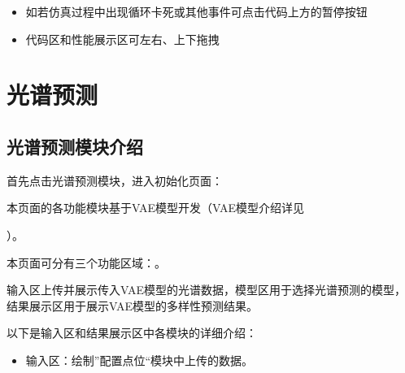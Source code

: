 \documentclass[letterpaper,10pt,english]{sphinxmanual}
\begin{document}
{{{{\begin{itemize}
\item {} 
\sphinxAtStartPar
如若仿真过程中出现循环卡死或其他事件可点击代码上方的暂停按钮

\item {} 
\sphinxAtStartPar
代码区和性能展示区可左右、上下拖拽

\end{itemize}

\sphinxstepscope


\section{光谱预测}
\label{\detokenize{_u8f6f_u4ef6_u6a21_u5757_u4ecb_u7ecd/_u5149_u8c31_u9884_u6d4b/contents:id1}}\label{\detokenize{_u8f6f_u4ef6_u6a21_u5757_u4ecb_u7ecd/_u5149_u8c31_u9884_u6d4b/contents::doc}}

\subsection{光谱预测模块介绍}
\label{\detokenize{_u8f6f_u4ef6_u6a21_u5757_u4ecb_u7ecd/_u5149_u8c31_u9884_u6d4b/contents:id2}}
\sphinxAtStartPar
首先点击光谱预测模块，进入初始化页面：

\sphinxAtStartPar
{}



\sphinxAtStartPar
本页面的各功能模块基于VAE模型开发（VAE模型介绍详见%
\begin{footnote}[9]\sphinxAtStartFootnote
{}
%
\end{footnote}）。

\sphinxAtStartPar
本页面可分有三个功能区域：。

\sphinxAtStartPar
输入区上传并展示传入VAE模型的光谱数据，模型区用于选择光谱预测的模型，结果展示区用于展示VAE模型的多样性预测结果。

\sphinxAtStartPar
以下是输入区和结果展示区中各模块的详细介绍：
\begin{itemize}
\item {} 
\sphinxAtStartPar
输入区：绘制”配置点位“模块中上传的数据。


\end{itemize}}}}}
\end{document}
